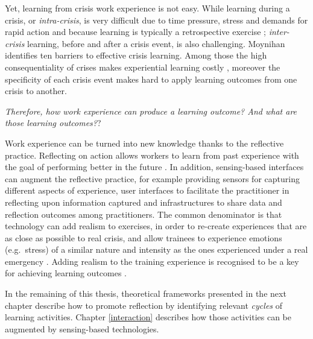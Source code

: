 Yet, learning from crisis work experience is not easy. While learning during a crisis, or \emph{intra-crisis}, is very difficult due to time pressure, stress and demands for rapid action \autocite{Deverell:2009fk} and because learning is typically a retrospective exercise \autocite{jasanoff1994learning}; \emph{inter-crisis} learning, before and after a crisis event, is also challenging. Moynihan \autocite*{Moynihan:2008gq} identifies ten barriers to effective crisis learning. Among those the high consequentiality of crises makes experiential learning costly \autocite{LaPorte:1991gk}, moreover the specificity of each crisis event makes hard to apply learning outcomes from one crisis to another.

\emph{Therefore, how work experience can produce a learning outcome? And what are those learning outcomes?}?

Work experience can be turned into new knowledge thanks to the reflective practice. Reflecting on action allows workers to learn from past experience with the goal of performing better in the future \autocites{boud1985reflection}{Schon:1983ut}. In addition, sensing-based interfaces can augment the reflective practice, for example providing sensors for capturing different aspects of experience, user interfaces to facilitate the practitioner in reflecting upon information captured and infrastructures to share data and reflection outcomes among practitioners. The common denominator is that technology can add realism to exercises, in order to re-create experiences that are as close as possible to real crisis, and allow trainees to experience emotions (e.g.~stress) of a similar nature and intensity as the ones experienced under a real emergency \autocite{MacKinnon:2012wz}. Adding realism to the training experience is recognised to be a key for achieving learning outcomes \autocite{Asproth:2013vs}.

In the remaining of this thesis, theoretical frameworks presented in the next chapter describe how to promote reflection by identifying relevant \emph{cycles} of learning activities. Chapter \ref{interaction} describes how those activities can be augmented by sensing-based technologies. 
